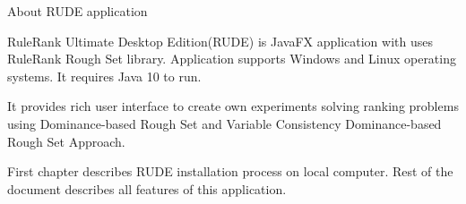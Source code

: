 \begin{Large}
	About RUDE application
\end{Large}
\newline

RuleRank Ultimate Desktop Edition(RUDE) is JavaFX application with uses RuleRank Rough Set library. Application supports Windows and Linux operating systems. It requires Java 10 to run.
\newline

It provides rich user interface to create own experiments solving ranking problems using Dominance-based Rough Set and Variable Consistency Dominance-based Rough Set Approach.
\newline

First chapter describes RUDE installation process on local computer. Rest of the document describes all features of this application.

\vfill\newpage